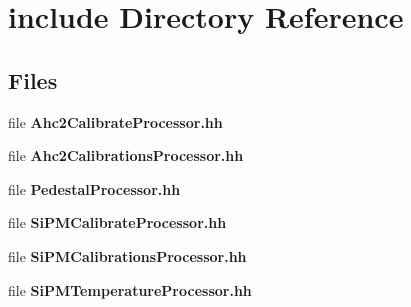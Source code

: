 \section{include Directory Reference}
\label{dir_2212ab3b802b64dc055e16a7abddfff7}
\subsection*{Files}
\begin{DoxyCompactItemize}
\item 
file {\bfseries Ahc2\-Calibrate\-Processor.\-hh}
\item 
file {\bfseries Ahc2\-Calibrations\-Processor.\-hh}
\item 
file {\bfseries Pedestal\-Processor.\-hh}
\item 
file {\bfseries Si\-P\-M\-Calibrate\-Processor.\-hh}
\item 
file {\bfseries Si\-P\-M\-Calibrations\-Processor.\-hh}
\item 
file {\bfseries Si\-P\-M\-Temperature\-Processor.\-hh}
\end{DoxyCompactItemize}
